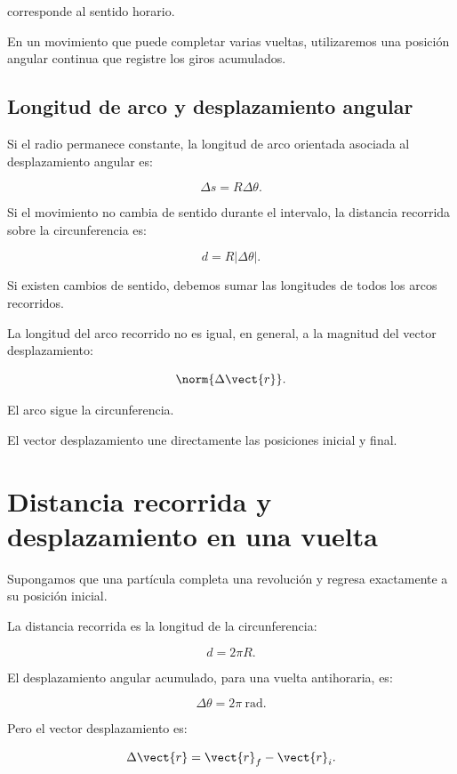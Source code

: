 corresponde al sentido horario.

En un movimiento que puede completar varias vueltas, utilizaremos una
posición angular continua que registre los giros acumulados.


\subsection{Longitud de arco y desplazamiento angular}

Si el radio permanece constante, la longitud de arco orientada asociada al
desplazamiento angular es:

\[
\boxed{\Delta s=R\Delta\theta}.
\]

Si el movimiento no cambia de sentido durante el intervalo, la distancia
recorrida sobre la circunferencia es:

\[
\boxed{d=R|\Delta\theta|}.
\]

Si existen cambios de sentido, debemos sumar las longitudes de todos los arcos
recorridos.

\begin{errorfrecuente}

La longitud del arco recorrido no es igual, en general, a la magnitud del
vector desplazamiento:

\[
\norm{\Delta\vect{r}}.
\]

El arco sigue la circunferencia.

El vector desplazamiento une directamente las posiciones inicial y final.

\end{errorfrecuente}


\section{Distancia recorrida y desplazamiento en una vuelta}

Supongamos que una partícula completa una revolución y regresa exactamente a
su posición inicial.

La distancia recorrida es la longitud de la circunferencia:

\[
\boxed{d=2\pi R}.
\]

El desplazamiento angular acumulado, para una vuelta antihoraria, es:

\[
\boxed{\Delta\theta=2\pi\ \si{\radian}}.
\]

Pero el vector desplazamiento es:

\[
\Delta\vect{r}
=
\vect{r}_f-\vect{r}_i.
\]

